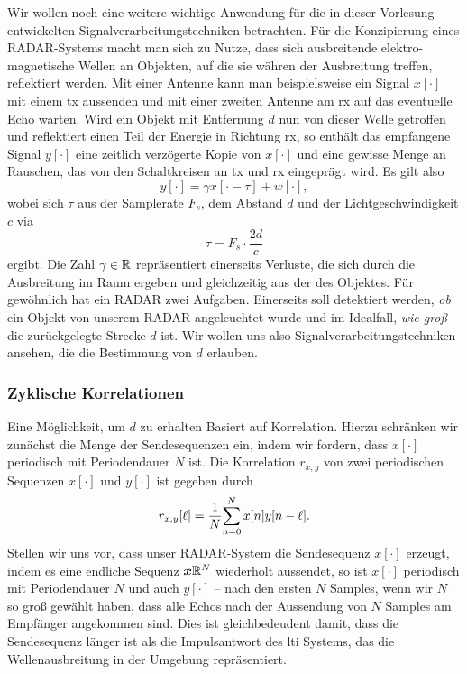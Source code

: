 Wir wollen noch eine weitere wichtige Anwendung für die in dieser Vorlesung entwickelten Signalverarbeitungstechniken betrachten.
Für die Konzipierung eines RADAR-Systems macht man sich zu Nutze, dass sich ausbreitende elektro-magnetische Wellen an Objekten, auf die sie währen der Ausbreitung treffen, reflektiert werden.
Mit einer Antenne kann man beispielsweise ein Signal $x[\cdot]$ mit einem \gls{tx} aussenden und mit einer zweiten Antenne am \gls{rx} auf das eventuelle Echo warten.
Wird ein Objekt mit Entfernung $d$ nun von dieser Welle getroffen und reflektiert einen Teil der Energie in Richtung \gls{rx}, so enthält das empfangene Signal $y[\cdot]$ eine zeitlich verzögerte Kopie von $x[\cdot]$ und eine gewisse Menge an Rauschen, das von den Schaltkreisen an \gls{tx} und \gls{rx} eingeprägt wird.
Es gilt also
\[
y[\cdot] = \gamma x[\cdot - \tau] + w[\cdot],
\]
wobei sich $\tau$ aus der Samplerate $F_s$, dem Abstand $d$ und der Lichtgeschwindigkeit $c$ via
\[
\tau = F_s \cdot \frac{2d}{c} 
\]
ergibt.
Die Zahl $\gamma \in \mathbb{R}$ repräsentiert einerseits Verluste, die sich durch die Ausbreitung im Raum ergeben und gleichzeitig aus der  des Objektes.
Für gewöhnlich hat ein RADAR zwei Aufgaben. 
Einerseits soll detektiert werden, \emph{ob} ein Objekt von unserem RADAR angeleuchtet wurde und im Idealfall, \emph{wie groß} die zurückgelegte Strecke $d$ ist.
Wir wollen uns also Signalverarbeitungstechniken ansehen, die die Bestimmung von $d$ erlauben.
%
\subsubsection{Zyklische Korrelationen}
%
Eine Möglichkeit, um $d$ zu erhalten Basiert auf Korrelation.
Hierzu schränken wir zunächst die Menge der Sendesequenzen ein, indem wir fordern, dass $x[\cdot]$ periodisch mit Periodendauer $N$ ist.
Die Korrelation $r_{x,y}$ von zwei periodischen Sequenzen $x[\cdot]$ und $y[\cdot]$ ist gegeben durch
\begin{equation}\label{eq:mseq:corr}
    r_{x,y}[\ell] = \frac{1}{N}{\sum\limits_{n = 0}^{N}{
        x[n]y[n - \ell]
    }}.
\end{equation}
Stellen wir uns vor, dass unser RADAR-System die Sendesequenz $x[\cdot]$ erzeugt, indem es eine endliche Sequenz $\bm x \mathbb{R}^{N}$ wiederholt aussendet, so ist $x[\cdot]$ periodisch mit Periodendauer $N$ und auch $y[\cdot]$ -- nach den ersten $N$ Samples, wenn wir $N$ so groß gewählt haben, dass alle Echos nach der Aussendung von $N$ Samples am Empfänger angekommen sind.
Dies ist gleichbedeudent damit, dass die Sendesequenz länger ist als die Impulsantwort des \gls{lti} Systems, das die Wellenausbreitung in der Umgebung repräsentiert.

